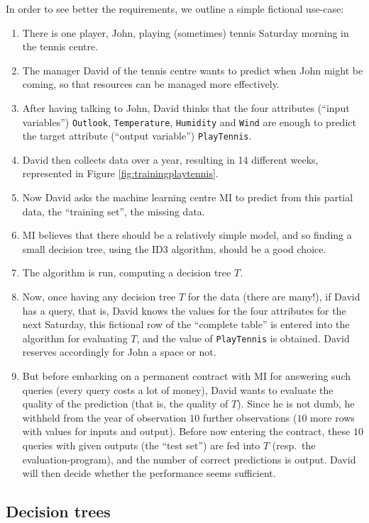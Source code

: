 \documentclass{report}
\begin{document}
In order to see better the requirements, we outline a simple fictional use-case:
\begin{enumerate}
\item There is one player, John, playing (sometimes) tennis Saturday morning in the tennis centre.
\item The manager David of the tennis centre wants to predict when John might be coming, so that resources can be managed more effectively.
\item After having talking to John, David thinks that the four attributes (``input variables'') \texttt{Outlook}, \texttt{Temperature}, \texttt{Humidity} and \texttt{Wind} are enough to predict the target attribute (``output variable'') \texttt{PlayTennis}.
\item David then collects data over a year, resulting in 14 different weeks, represented in Figure \ref{fig:trainingplaytennis}.
\item Now David asks the machine learning centre MI to predict from this partial data, the ``training set'', the missing data.
\item MI believes that there should be a relatively simple model, and so finding a small decision tree, using the ID3 algorithm, should be a good choice.
\item The algorithm is run, computing a decision tree $T$.
\item Now, once having any decision tree $T$ for the data (there are many!), if David has a query, that is, David knows the values for the four attributes for the next Saturday, this fictional row of the ``complete table'' is entered into the algorithm for evaluating $T$, and the value of \texttt{PlayTennis} is obtained. David reserves accordingly for John a space or not.
\item But before embarking on a permanent contract with MI for answering such queries (every query costs a lot of money), David wants to evaluate the quality of the prediction (that is, the quality of $T$). Since he is not dumb, he withheld from the year of observation $10$ further observations ($10$ more rows with values for inputs and output). Before now entering the contract, these $10$ queries with given outputs (the ``test set'') are fed into $T$ (resp.\ the evaluation-program), and the number of correct predictions is output. David will then decide whether the performance seems sufficient.
\end{enumerate}


\subsection{Decision trees}
\label{sec:dectree}
\end{document}
